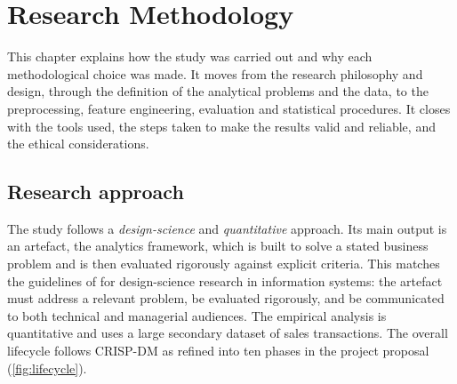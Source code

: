 \chapter{Research Methodology}\label{ch:method}

This chapter explains how the study was carried out and why each methodological choice was made. It moves
from the research philosophy and design, through the definition of the analytical problems and the data, to
the preprocessing, feature engineering, evaluation and statistical procedures. It closes with the tools used,
the steps taken to make the results valid and reliable, and the ethical considerations.

\section{Research approach}
The study follows a \emph{design-science} and \emph{quantitative} approach. Its main output is an artefact, the
analytics framework, which is built to solve a stated business problem and is then evaluated rigorously against
explicit criteria. This matches the guidelines of \citet{hevner2004} for design-science research in information
systems: the artefact must address a relevant problem, be evaluated rigorously, and be communicated to both
technical and managerial audiences. The empirical analysis is quantitative and uses a large secondary dataset of sales
transactions. The overall lifecycle follows CRISP-DM \citep{shearer2000} as refined into ten phases in the
project proposal (\cref{fig:lifecycle}).


